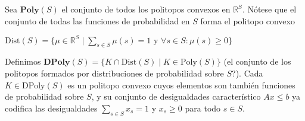 Sea \( \textbf{Poly}(S) \) el conjunto de todos los politopos convexos en \(
\mathbb{R}^S \). Nótese que el conjunto de todas las funciones de probabilidad
en \( S \) forma el politopo convexo

\( \text{Dist}(S) = \{ \mu \in \mathbb{R}^S \mid \sum_{s \in S} \mu(s) = 1 \text{ y } \forall s \in S : \mu(s) \geq 0 \} \)

Definimos \( \textbf{DPoly}(S) = \{ K \cap \text{Dist}(S) \mid K \in
\text{Poly}(S) \} \) (el conjunto de los politopos formados por distribuciones
de probabilidad sobre $S$?). Cada \( K \in \text{DPoly}(S) \) es un politopo
convexo cuyos elementos son también funciones de probabilidad sobre \( S \), y
su conjunto de desigualdades característico \( Ax \leq b \) ya codifica las
desigualdades \( \sum_{s \in S} x_s = 1 \) y \( x_s \geq 0 \) para todo \( s
\in S \).






